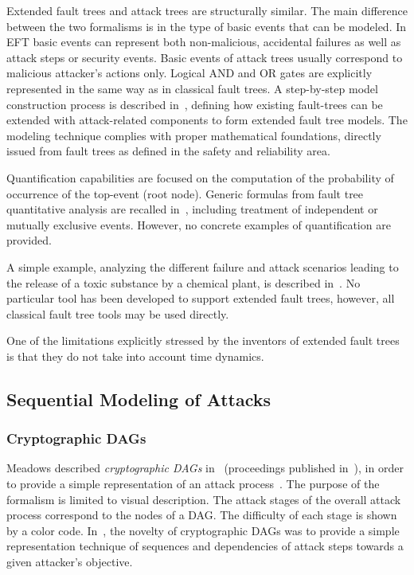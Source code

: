 \documentclass[a4paper]{article}
\begin{document}
Extended fault trees and attack trees are structurally similar. The main
difference between the two formalisms is in the type of basic events  that can
be modeled. In EFT basic events can represent both non-malicious, accidental
failures  as well as attack steps or security events. Basic events of attack
trees usually correspond to malicious attacker's actions only. Logical AND and
OR gates are explicitly represented in the same way as in classical fault trees.
A step-by-step model construction process is described in~\cite{FoMaCi},
defining how existing fault-trees can be extended with attack-related components
to form extended fault tree models. The modeling technique complies with proper
mathematical foundations,  directly issued from fault trees as defined in the
safety and reliability area.

Quantification capabilities are focused on the computation of the probability
of occurrence of the top-event (root node). Generic formulas from fault tree
quantitative analysis are recalled in~\cite{FoMaCi}, including treatment of 
independent or mutually exclusive events. However, no concrete examples of 
quantification are provided.

A simple example, analyzing the different failure and attack scenarios leading
to the release of a toxic substance by a chemical plant, is described
in~\cite{FoMaCi}. No particular tool has been developed to support extended
fault trees, however, all classical fault tree tools may be used directly.

One of the limitations explicitly stressed by the inventors of extended fault
trees is that they do not take into account time dynamics. 

\subsection{Sequential Modeling of Attacks}
\label{sec:offensive_sequential}

\subsubsection{Cryptographic DAGs} 
\label{sec:cryptographic_dag}

Meadows described \emph{cryptographic DAGs} in~ (proceedings published
in~), in order to provide a simple representation of an attack
process~\cite{Mead2}. The purpose of the formalism is limited to visual
description. The attack stages of the overall attack process correspond to the
nodes of a DAG. The difficulty of each stage is shown by a color code.
In~, the novelty of cryptographic DAGs was to provide a simple
representation technique of sequences and dependencies of attack steps towards a
given attacker's objective.
\end{document}

